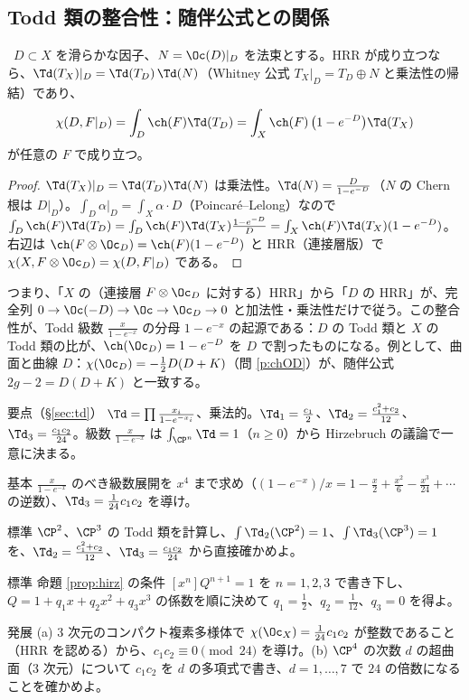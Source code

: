 \subsection{Todd 類の整合性：随伴公式との関係}
\begin{prop}[因子上の整合性]\label{prop:toddD}\tP\
$D\subset X$ を滑らかな因子、$N=\Oc(D)|_D$ を法束とする。HRR が成り立つなら、$\Td(T_X)|_D=\Td(T_D)\,\Td(N)$（Whitney 公式 $T_X|_D=T_D\oplus N$ と乗法性の帰結）であり、
\[
\chi(D,F|_D)=\int_D\ch(F)\Td(T_D)=\int_X\ch(F)\,\bigl(1-e^{-D}\bigr)\Td(T_X)
\]
が任意の $F$ で成り立つ。
\end{prop}
\begin{proof}
$\Td(T_X)|_D=\Td(T_D)\Td(N)$ は乗法性。$\Td(N)=\frac{D}{1-e^{-D}}$（$N$ の Chern 根は $D|_D$）。$\int_D\alpha|_D=\int_X\alpha\cdot D$（Poincaré--Lelong）なので
$\int_D\ch(F)\Td(T_D)=\int_D\ch(F)\Td(T_X)\frac{1-e^{-D}}D=\int_X\ch(F)\Td(T_X)(1-e^{-D})$。右辺は $\ch(F\otimes\Oc_D)=\ch(F)(1-e^{-D})$ と HRR（連接層版）で $\chi(X,F\otimes\Oc_D)=\chi(D,F|_D)$ である。
\end{proof}
\noindent つまり、「$X$ の（連接層 $F\otimes\Oc_D$ に対する）HRR」から「$D$ の HRR」が、完全列 $0\to\Oc(-D)\to\Oc\to\Oc_D\to0$ と加法性・乗法性だけで従う。この整合性が、Todd 級数 $\frac x{1-e^{-x}}$ の分母 $1-e^{-x}$ の起源である：$D$ の Todd 類と $X$ の Todd 類の比が、$\ch(\Oc_D)=1-e^{-D}$ を $D$ で割ったものになる。例として、曲面と曲線 $D$：$\chi(\Oc_D)=-\frac12D(D+K)$（問 \ref{p:chOD}）が、随伴公式 $2g-2=D(D+K)$ と一致する。
\begin{keybox}{要点（\S\ref{sec:td}）}
$\Td=\prod\frac{x_i}{1-e^{-x_i}}$、乗法的。$\Td_1=\frac{c_1}2$、$\Td_2=\frac{c_1^2+c_2}{12}$、$\Td_3=\frac{c_1c_2}{24}$。級数 $\frac x{1-e^{-x}}$ は $\int_{\CP^n}\Td=1$（$n\ge0$）から Hirzebruch の議論で一意に決まる。
\end{keybox}
\begin{prob}{基本}\label{p:todd3}
$\frac x{1-e^{-x}}$ のべき級数展開を $x^4$ まで求め（$(1-e^{-x})/x=1-\frac x2+\frac{x^2}6-\frac{x^3}{24}+\cdots$ の逆数）、$\Td_3=\frac1{24}c_1c_2$ を導け。
\end{prob}
\begin{prob}{標準}\label{p:ToddPn}
$\CP^2$、$\CP^3$ の Todd 類を計算し、$\int\Td_2(\CP^2)=1$、$\int\Td_3(\CP^3)=1$ を、$\Td_2=\frac{c_1^2+c_2}{12}$、$\Td_3=\frac{c_1c_2}{24}$ から直接確かめよ。
\end{prob}
\begin{prob}{標準}\label{p:hirzbasic}
命題 \ref{prop:hirz} の条件 $[x^n]Q^{n+1}=1$ を $n=1,2,3$ で書き下し、$Q=1+q_1x+q_2x^2+q_3x^3$ の係数を順に決めて $q_1=\frac12$、$q_2=\frac1{12}$、$q_3=0$ を得よ。
\end{prob}
\begin{prob}{発展}\label{p:integral}
(a) 3 次元のコンパクト複素多様体で $\chi(\Oc_X)=\frac1{24}c_1c_2$ が整数であること（HRR を認める）から、$c_1c_2\equiv0\pmod{24}$ を導け。(b) $\CP^4$ の次数 $d$ の超曲面（3 次元）について $c_1c_2$ を $d$ の多項式で書き、$d=1,\dots,7$ で $24$ の倍数になることを確かめよ。
\end{prob}
